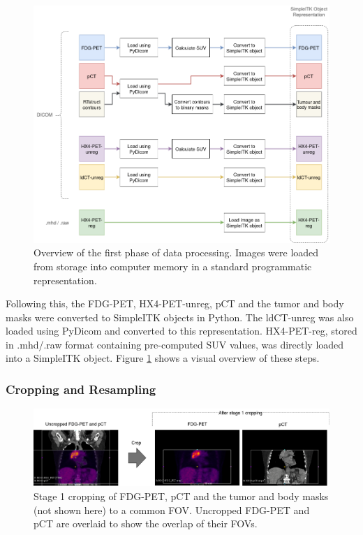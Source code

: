 \begin{figure}[h!]
    \centering
    \includegraphics[width=0.9\linewidth]{figures/Data/data_processing_overview-step_1.png}
    \caption{Overview of the first phase of data processing. Images were loaded from storage into computer memory in a standard programmatic representation.}
    \label{fig:data_proc_overview_1}
\end{figure}

Following this, the FDG-PET, HX4-PET-unreg, pCT and the tumor and body masks were converted to SimpleITK objects in Python. The ldCT-unreg was also loaded using PyDicom and converted to this representation. HX4-PET-reg, stored in .mhd/.raw format containing pre-computed SUV values, was directly loaded into a SimpleITK object. Figure \ref{fig:data_proc_overview_1} shows a visual overview of these steps.


\subsubsection{Cropping and Resampling}

\begin{figure}[h!]
    \centering
    \includegraphics[width=\linewidth]{figures/Data/fdgpet_pct_crop1/N010-FDG_PET_pCT-uncropped_crop1.png}
    \caption{Stage 1 cropping of FDG-PET, pCT and the tumor and body masks (not shown here) to a common FOV. Uncropped FDG-PET and pCT are overlaid to show the overlap of their FOVs.}
    \label{fig:fdg_pet_pct_crop1}
\end{figure}

